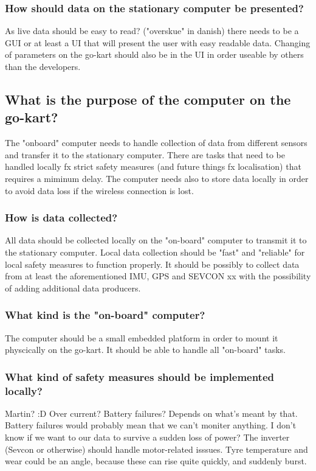 \subsubsection*{How should data on the stationary computer be presented?}
As live data should be easy to read? ("overskue" in danish) there needs to be a GUI or at least a UI that will present the user with easy readable data. 
Changing of parameters on the go-kart should also be in the UI in order useable by others than the developers.

\subsection{What is the purpose of the computer on the go-kart?}
The "onboard" computer needs to handle collection of data from different sensors and transfer it to the stationary computer.
There are tasks that need to be handled locally fx strict safety measures (and future things fx localisation) that requires a miminum delay. 
The computer needs also to store data locally in order to avoid data loss if the wireless connection is lost.

\subsubsection*{How is data collected?}
All data should be collected locally on the "on-board" computer to transmit it to the stationary computer.
Local data collection should be "fast" and "reliable" for local safety measures to function properly.
It should be possibly to collect data from at least the aforementioned IMU, GPS and SEVCON xx with the possibility of adding additional data producers.

\subsubsection*{What kind is the "on-board" computer?}
The computer should be a small embedded platform in order to mount it physcically on the go-kart.
It should be able to handle all "on-board" tasks.

\subsubsection*{What kind of safety measures should be implemented locally?}
Martin? :D Over current? Battery failures? Depends on what's meant by that. Battery failures would probably mean that we can't moniter anything. I don't know if we want to our data to survive a sudden loss of power? The inverter (Sevcon or otherwise) should handle motor-related isssues. Tyre temperature and wear could be an angle, because these can rise quite quickly, and suddenly burst.


